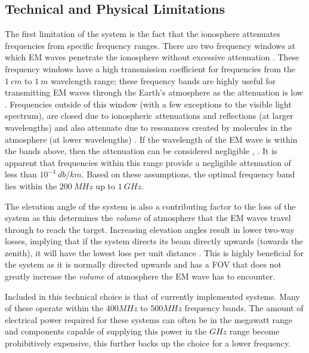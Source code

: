 \documentclass[11pt]{witseiepaper}
\begin{document}
\begin{bibunit}[witseie]
\subsection{Technical and Physical Limitations} \label{sec:TechnicalandPhysicalLimitations}
The first limitation of the system is the fact that the ionosphere attenuates frequencies from specific frequency ranges. There are two frequency windows at which EM waves penetrate the ionosphere without excessive attenuation \cite{ObjectInformation}.
These frequency windows have a high transmission coefficient for frequencies from the $1~cm$ to $1~m$ wavelength range; these frequency bands are highly useful for transmitting EM waves through the Earth's atmosphere as the attenuation is low \cite{frequencyAttenuation}. Frequencies outside of this window (with a few exceptions to the visible light spectrum), are closed due to ionospheric attenuations and reflections (at larger wavelengths) and also attenuate due to resonances created by molecules in the atmosphere (at lower wavelengths) \cite{frequencyAttenuation}.  
If the wavelength of the EM wave is within the bands above, then the attenuation can be considered negligible \cite{ionosphereAttenuationStandard}, \cite[p.~15,124]{radarHandbook}. It is apparent that frequencies within this range provide a negligible attenuation of less than $10^{-3}~db/km$.
Based on these assumptions, the optimal frequency band lies within the $200~MHz$ up to $1~GHz$. %

The elevation angle of the system is also a contributing factor to the loss of the system as this determines the \textit{volume} of atmosphere that the EM waves travel through to reach the target. Increasing elevation angles result in lower two-way losses, implying that if the system directs its beam directly upwards (towards the zenith), it will have the lowest loss per unit distance \cite[p.~70]{elevationLoss}. This is highly beneficial for the system as it is normally directed upwards and has a FOV that does not greatly increase the \textit{volume} of atmosphere the EM wave has to encounter.


Included in this technical choice is that of currently implemented systems. Many of these operate within the $400 MHz$ to $500 MHz$ frequency bands.
The amount of electrical power required for these systems can often be in the megawatt range and components capable of supplying this power in the $GHz$ range become prohibitively expensive, this further backs up the choice for a lower frequency.


\end{bibunit}
\end{document}
